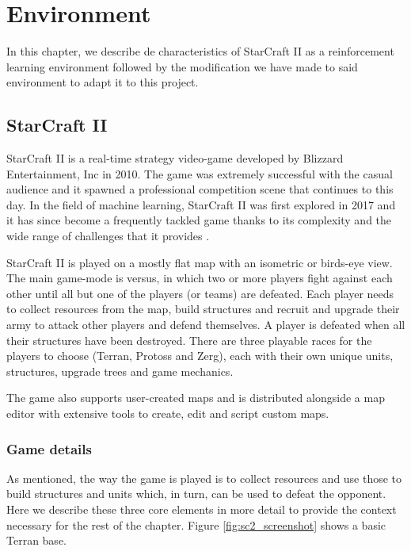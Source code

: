 \chapter{Environment}
\label{chapter:environment}

In this chapter, we describe de characteristics of StarCraft II as a reinforcement learning environment followed by the modification we have made to said environment to adapt it to this project.

\section{StarCraft II}

StarCraft II is a real-time strategy video-game developed by Blizzard Entertainment, Inc in 2010. The game was extremely successful with the casual audience and it spawned a professional competition scene that continues to this day. In the field of machine learning, StarCraft II was first explored in 2017 \cite{Vinyals:2017} and it has since become a frequently tackled game thanks to its complexity and the wide range of challenges that it provides \cite{Tang:2018}.

StarCraft II is played on a mostly flat map with an isometric or birds-eye view. The main game-mode is versus, in which two or more players fight against each other until all but one of the players (or teams) are defeated. Each player needs to collect resources from the map, build structures and recruit and upgrade their army to attack other players and defend themselves. A player is defeated when all their structures have been destroyed. There are three playable races for the players to choose (Terran, Protoss and Zerg), each with their own unique units, structures, upgrade trees and game mechanics.

The game also supports user-created maps and is distributed alongside a map editor with extensive tools to create, edit and script custom maps.

\subsection{Game details}

As mentioned, the way the game is played is to collect resources and use those to build structures and units which, in turn, can be used to defeat the opponent. Here we describe these three core elements in more detail to provide the context necessary for the rest of the chapter. Figure \ref{fig:sc2_screenshot} shows a basic Terran base.

